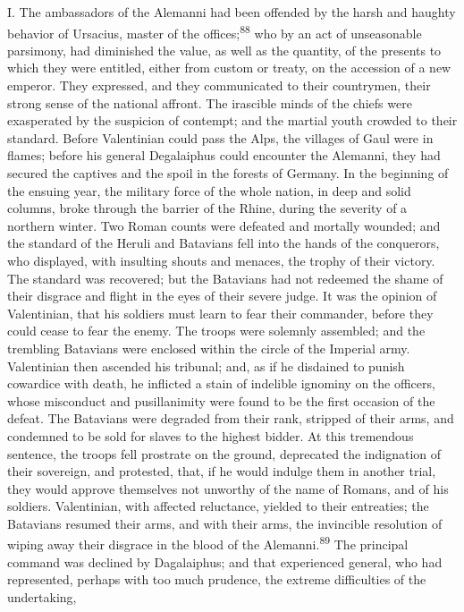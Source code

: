 I. The ambassadors of the Alemanni had been offended by the harsh
and haughty behavior of Ursacius, master of the offices;\textsuperscript{88} who
by an act of unseasonable parsimony, had diminished the value, as
well as the quantity, of the presents to which they were
entitled, either from custom or treaty, on the accession of a new
emperor. They expressed, and they communicated to their
countrymen, their strong sense of the national affront. The
irascible minds of the chiefs were exasperated by the suspicion
of contempt; and the martial youth crowded to their standard.
Before Valentinian could pass the Alps, the villages of Gaul were
in flames; before his general Degalaiphus could encounter the
Alemanni, they had secured the captives and the spoil in the
forests of Germany. In the beginning of the ensuing year, the
military force of the whole nation, in deep and solid columns,
broke through the barrier of the Rhine, during the severity of a
northern winter. Two Roman counts were defeated and mortally
wounded; and the standard of the Heruli and Batavians fell into
the hands of the conquerors, who displayed, with insulting shouts
and menaces, the trophy of their victory. The standard was
recovered; but the Batavians had not redeemed the shame of their
disgrace and flight in the eyes of their severe judge. It was the
opinion of Valentinian, that his soldiers must learn to fear
their commander, before they could cease to fear the enemy. The
troops were solemnly assembled; and the trembling Batavians were
enclosed within the circle of the Imperial army. Valentinian then
ascended his tribunal; and, as if he disdained to punish
cowardice with death, he inflicted a stain of indelible ignominy
on the officers, whose misconduct and pusillanimity were found to
be the first occasion of the defeat. The Batavians were degraded
from their rank, stripped of their arms, and condemned to be sold
for slaves to the highest bidder. At this tremendous sentence,
the troops fell prostrate on the ground, deprecated the
indignation of their sovereign, and protested, that, if he would
indulge them in another trial, they would approve themselves not
unworthy of the name of Romans, and of his soldiers. Valentinian,
with affected reluctance, yielded to their entreaties; the
Batavians resumed their arms, and with their arms, the invincible
resolution of wiping away their disgrace in the blood of the
Alemanni.\textsuperscript{89} The principal command was declined by Dagalaiphus;
and that experienced general, who had represented, perhaps with
too much prudence, the extreme difficulties of the undertaking,
